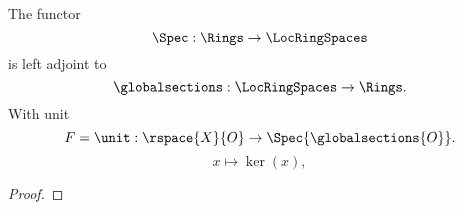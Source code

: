 \begin{lemma}
The functor \[\Spec: \Rings \rightarrow \LocRingSpaces\]
is left adjoint to \[\globalsections: \LocRingSpaces \rightarrow \Rings.\]
With unit 
\[ F = \unit : \rspace{X}{O} \rightarrow \Spec{\globalsections{O}}.\]
\[ x \mapsto \ker(x),\]
\end{lemma}

\begin{proof}

\end{proof}